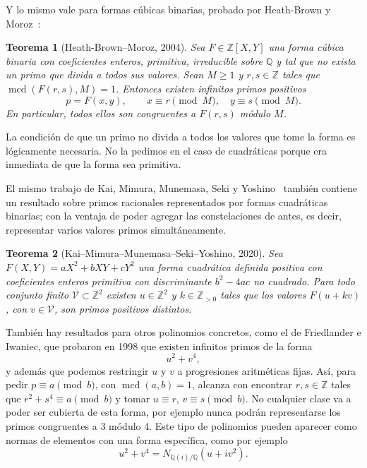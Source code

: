 \documentclass[a4paper]{book}
\theoremstyle{definition}
\theoremstyle{plain}
\newtheorem*{theorem*}{Teorema}
\DeclareMathOperator{\mcd}{mcd}
\newcommand{\QQ}{\mathbb{Q}}
\newcommand{\ZZ}{\mathbb{Z}}
\begin{document}
Y lo mismo vale para formas cúbicas binarias, probado por Heath-Brown y Moroz~\cite{HeathBrownMoroz2004}:

\begin{theorem*}[Heath-Brown--Moroz, 2004]
Sea $F\in\ZZ[X,Y]$ una forma cúbica binaria con coeficientes enteros, primitiva, irreducible sobre $\QQ$ y tal que no exista un primo que divida a todos sus valores. Sean $M\geq1$ y $r,s\in\ZZ$ tales que $\mcd(F(r,s),M)=1$. Entonces existen infinitos primos positivos
\[
p=F(x,y),\qquad x\equiv r\pmod M,\quad y\equiv s\pmod M.
\]
En particular, todos ellos son congruentes a $F(r,s)$ módulo $M$.
\end{theorem*}

La condición de que un primo no divida a todos los valores que tome la forma es lógicamente necesaria. No la pedimos en el caso de cuadráticas porque era inmediata de que la forma sea primitiva.

El mismo trabajo de Kai, Mimura, Munemasa, Seki y Yoshino~\cite{KaiMimuraMunemasaSekiYoshino2020} también contiene un resultado sobre primos racionales representados por formas cuadráticas binarias; con la ventaja de poder agregar las constelaciones de antes, es decir, representar varios valores primos simultáneamente.

\begin{theorem*}[Kai--Mimura--Munemasa--Seki--Yoshino, 2020]
Sea $F(X,Y)=aX^2+bXY+cY^2$ una forma cuadrática definida positiva con coeficientes enteros primitiva con discriminante $b^2-4ac$ no cuadrado. Para todo conjunto finito $\mathcal V\subset\ZZ^2$ existen $u\in\ZZ^2$ y $k\in\ZZ_{>0}$ tales que los valores $F(u+kv)$, con $v\in\mathcal V$, son primos positivos distintos.
\end{theorem*}


También hay resultados para otros polinomios concretos, como el de Friedlander e Iwaniec, que probaron en 1998 que existen infinitos primos de la forma
\[
u^2+v^4,
\]
y además que podemos restringir $u$ y $v$ a progresiones aritméticas fijas. Así, para pedir $p\equiv a\pmod b$, con $\mcd(a,b)=1$, alcanza con encontrar $r,s\in\ZZ$ tales que $r^2+s^4\equiv a\pmod b$ y tomar $u\equiv r$, $v\equiv s\pmod b$. No cualquier clase va a poder ser cubierta de esta forma, por ejemplo nunca podrán representarse los primos congruentes a $3$ módulo 4. Este tipo de polinomios pueden aparecer como normas de elementos con una forma específica, como por ejemplo
\[
u^2+v^4=N_{\QQ(i)/\QQ}(u+iv^2).
\]
\end{document}
